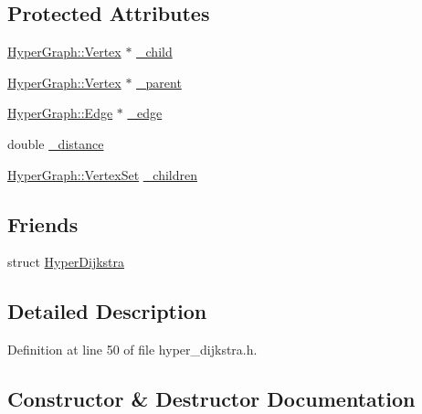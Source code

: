 \subsection*{Protected Attributes}
\begin{DoxyCompactItemize}
\item 
\hyperlink{classg2o_1_1HyperGraph_1_1Vertex}{Hyper\+Graph\+::\+Vertex} $\ast$ \hyperlink{structg2o_1_1HyperDijkstra_1_1AdjacencyMapEntry_a7ccdf917414efa537c3942d360ca127a}{\+\_\+child}
\item 
\hyperlink{classg2o_1_1HyperGraph_1_1Vertex}{Hyper\+Graph\+::\+Vertex} $\ast$ \hyperlink{structg2o_1_1HyperDijkstra_1_1AdjacencyMapEntry_a3490ab9668c98d3e0cb14c54b9d41747}{\+\_\+parent}
\item 
\hyperlink{classg2o_1_1HyperGraph_1_1Edge}{Hyper\+Graph\+::\+Edge} $\ast$ \hyperlink{structg2o_1_1HyperDijkstra_1_1AdjacencyMapEntry_adc56c13a328aac02456474a9e7c72415}{\+\_\+edge}
\item 
double \hyperlink{structg2o_1_1HyperDijkstra_1_1AdjacencyMapEntry_a95b3db28f32badcdce2edf1bae83b78d}{\+\_\+distance}
\item 
\hyperlink{classg2o_1_1HyperGraph_a703938cdb4bb636860eed55a2489d70c}{Hyper\+Graph\+::\+Vertex\+Set} \hyperlink{structg2o_1_1HyperDijkstra_1_1AdjacencyMapEntry_a5b69ff3769d50a3229e2df80cac3f093}{\+\_\+children}
\end{DoxyCompactItemize}
\subsection*{Friends}
\begin{DoxyCompactItemize}
\item 
struct \hyperlink{structg2o_1_1HyperDijkstra_1_1AdjacencyMapEntry_a358d802df25b35f34e715710d1fa380c}{Hyper\+Dijkstra}
\end{DoxyCompactItemize}


\subsection{Detailed Description}


Definition at line 50 of file hyper\+\_\+dijkstra.\+h.



\subsection{Constructor \& Destructor Documentation}
